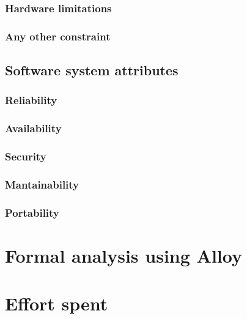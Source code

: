 \documentclass[12pt]{article}
\begin{document}
    \subsubsection{Hardware limitations}
    \subsubsection{Any other constraint}
  \subsection{Software system attributes}
    \subsubsection{Reliability}
    \subsubsection{Availability}
    \subsubsection{Security}
    \subsubsection{Mantainability}
    \subsubsection{Portability}

\clearpage
\section{Formal analysis using Alloy}
\label{sec:alloy}

\clearpage
\section{Effort spent}
\label{sec:effort}
\end{document}
